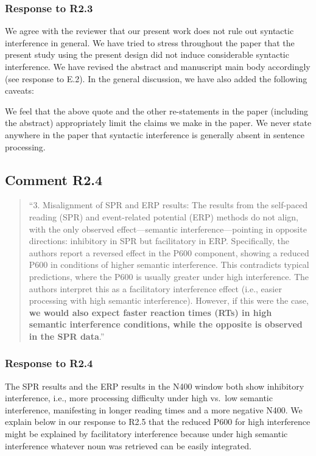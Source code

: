 \documentclass[12pt]{article}
\begin{document}
\subsubsection*{Response to R2.3}
We agree with the reviewer that our present work does not rule out syntactic interference in general. We have tried to stress throughout the paper that the present study using the present design did not induce considerable syntactic interference. We have revised the abstract and manuscript main body accordingly (see response to E.2). In the general discussion, we have also added the following caveats:

\begin{quote}
\end{quote}
 
 We feel that the above quote and the other re-statements in the paper (including the abstract) appropriately limit the claims we make in the paper. We never state anywhere in the paper that syntactic interference is generally absent in sentence processing.
  
\subsection*{Comment R2.4}
\begin{quote}
``3. Misalignment of SPR and ERP results: The results from the self-paced reading (SPR) and event-related potential (ERP) methods do not align, with the only observed effect—semantic interference—pointing in opposite directions: inhibitory in SPR but facilitatory in ERP. Specifically, the authors report a reversed effect in the P600 component, showing a reduced P600 in conditions of higher semantic interference. This contradicts typical predictions, where the P600 is usually greater under high interference. The authors interpret this as a facilitatory interference effect (i.e., easier processing with high semantic interference). However, if this were the case, \textbf{we would also expect faster reaction times (RTs) in high semantic interference conditions, while the opposite is observed in the SPR data}.''
\end{quote}

\subsubsection*{Response to R2.4}
The SPR results and the ERP results in the N400 window both show inhibitory interference, i.e., more processing difficulty under high vs.\ low semantic interference, manifesting in longer reading times and a more negative N400. We explain below in our response to R2.5 that the reduced P600 for high interference might be explained by facilitatory interference because under high semantic interference whatever noun was retrieved can be easily integrated. 
\end{document}
